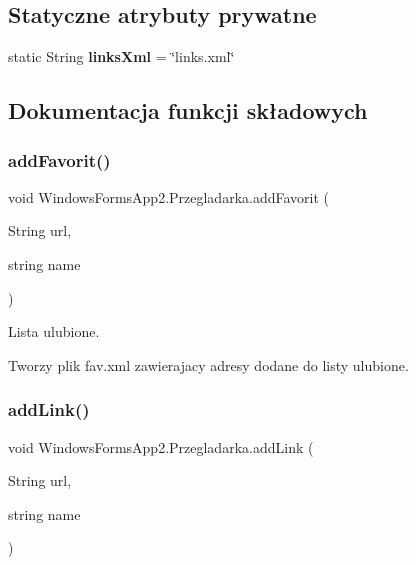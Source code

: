 \subsection*{Statyczne atrybuty prywatne}
\begin{DoxyCompactItemize}
\item 
\mbox{\label{class_windows_forms_app2_1_1_przegladarka_abef2d22eb265cae84b4100b314e8947f}} 
static String {\bfseries links\+Xml} = \char`\"{}links.\+xml\char`\"{}
\end{DoxyCompactItemize}


\subsection{Dokumentacja funkcji składowych}
\mbox{\label{class_windows_forms_app2_1_1_przegladarka_ae81e3a8848fdaaecd2f51a2f17e60540}} 
\subsubsection{\texorpdfstring{add\+Favorit()}{addFavorit()}}
{\footnotesize\ttfamily void Windows\+Forms\+App2.\+Przegladarka.\+add\+Favorit (\begin{DoxyParamCaption}\item[{String}]{url,  }\item[{string}]{name }\end{DoxyParamCaption})\hspace{0.3cm}{\ttfamily [private]}}

Lista ulubione.

Tworzy plik fav.\+xml zawierajacy adresy dodane do listy ulubione. \mbox{\label{class_windows_forms_app2_1_1_przegladarka_a317944e036dffa9dbae17e072ffce939}} 
\subsubsection{\texorpdfstring{add\+Link()}{addLink()}}
{\footnotesize\ttfamily void Windows\+Forms\+App2.\+Przegladarka.\+add\+Link (\begin{DoxyParamCaption}\item[{String}]{url,  }\item[{string}]{name }\end{DoxyParamCaption})\hspace{0.3cm}{\ttfamily [private]}}

